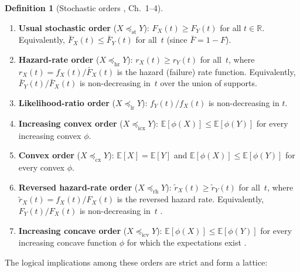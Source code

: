\documentclass[11pt,a4paper]{article}
\theoremstyle{plain}
\theoremstyle{definition}
\newtheorem{definition}[theorem]{Definition}
\theoremstyle{remark}
\begin{document}
\begin{definition}[Stochastic orders {\cite{shaked2007}, Ch.~1--4}]
\label{def:orders}
\begin{enumerate}
  \item \textbf{Usual stochastic order} ($X \preceq_{\mathrm{st}} Y$):
    $F_X(t) \geq F_Y(t)$ for all $t \in \mathbb{R}$.
    Equivalently, $\bar{F}_X(t) \leq \bar{F}_Y(t)$ for all~$t$
    (since $\bar{F} = 1 - F$).
  \item \textbf{Hazard-rate order} ($X \preceq_{\mathrm{hr}} Y$):
    $r_X(t) \geq r_Y(t)$ for all~$t$, where
    $r_X(t) = f_X(t)/\bar{F}_X(t)$ is the hazard (failure) rate function.
    Equivalently, $\bar{F}_Y(t)/\bar{F}_X(t)$ is non-decreasing in~$t$ over the
    union of supports.
  \item \textbf{Likelihood-ratio order} ($X \preceq_{\mathrm{lr}} Y$):
    $f_Y(t)/f_X(t)$ is non-decreasing in $t$.
  \item \textbf{Increasing convex order} ($X \preceq_{\mathrm{icx}} Y$):
    $\mathbb{E}[\phi(X)] \leq \mathbb{E}[\phi(Y)]$ for every increasing convex $\phi$.
  \item \textbf{Convex order} ($X \preceq_{\mathrm{cx}} Y$):
    $\mathbb{E}[X] = \mathbb{E}[Y]$ and
    $\mathbb{E}[\phi(X)] \leq \mathbb{E}[\phi(Y)]$ for every convex $\phi$.
  \item \textbf{Reversed hazard-rate order} ($X \preceq_{\mathrm{rh}} Y$):
    $\tilde{r}_X(t) \geq \tilde{r}_Y(t)$ for all~$t$, where
    $\tilde{r}_X(t) = f_X(t)/F_X(t)$ is the reversed hazard rate.
    Equivalently, $F_Y(t)/F_X(t)$ is non-decreasing in~$t$
    \cite[Ch.~1]{shaked2007}.
  \item \textbf{Increasing concave order} ($X \preceq_{\mathrm{icv}} Y$):
    $\mathbb{E}[\phi(X)] \leq \mathbb{E}[\phi(Y)]$ for every increasing concave
    function $\phi$ for which the expectations exist
    \cite[Sec.~4.A]{shaked2007}.
\end{enumerate}
\end{definition}

The logical implications among these orders are strict and form a lattice:

\end{document}
